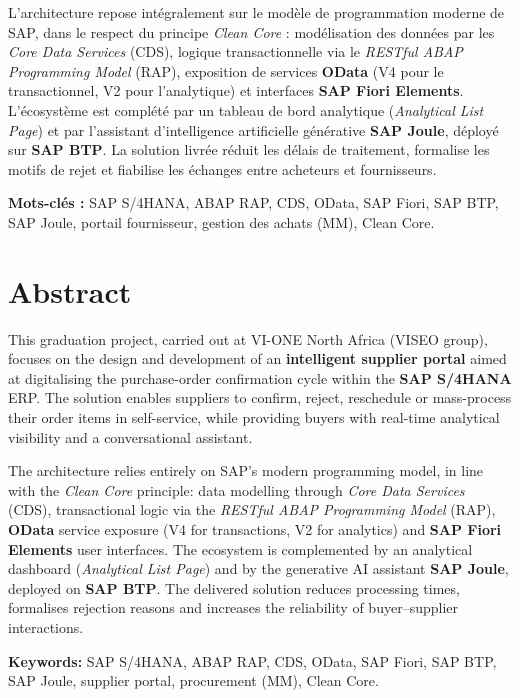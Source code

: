 \documentclass[12pt,a4paper,oneside]{report}
\begin{document}
L'architecture repose intégralement sur le modèle de programmation moderne de SAP, dans le
respect du principe \textit{Clean Core} : modélisation des données par les
\textit{Core Data Services} (CDS), logique transactionnelle via le \textit{RESTful ABAP
Programming Model} (RAP), exposition de services \textbf{OData} (V4 pour le
transactionnel, V2 pour l'analytique) et interfaces \textbf{SAP Fiori Elements}.
L'écosystème est complété par un tableau de bord analytique (\textit{Analytical List
Page}) et par l'assistant d'intelligence artificielle générative \textbf{SAP Joule},
déployé sur \textbf{SAP BTP}. La solution livrée réduit les délais de traitement,
formalise les motifs de rejet et fiabilise les échanges entre acheteurs et fournisseurs.

\vspace{0.3cm}
\noindent\textbf{Mots-clés :} SAP S/4HANA, ABAP RAP, CDS, OData, SAP Fiori, SAP BTP,
SAP Joule, portail fournisseur, gestion des achats (MM), Clean Core.

\chapter*{Abstract}
{}
\label{sec:abstract}

This graduation project, carried out at VI-ONE North Africa (VISEO group), focuses on the
design and development of an \textbf{intelligent supplier portal} aimed at digitalising the
purchase-order confirmation cycle within the \textbf{SAP S/4HANA} ERP. The solution enables
suppliers to confirm, reject, reschedule or mass-process their order items in self-service,
while providing buyers with real-time analytical visibility and a conversational assistant.

The architecture relies entirely on SAP's modern programming model, in line with the
\textit{Clean Core} principle: data modelling through \textit{Core Data Services} (CDS),
transactional logic via the \textit{RESTful ABAP Programming Model} (RAP), \textbf{OData}
service exposure (V4 for transactions, V2 for analytics) and \textbf{SAP Fiori Elements}
user interfaces. The ecosystem is complemented by an analytical dashboard
(\textit{Analytical List Page}) and by the generative AI assistant \textbf{SAP Joule},
deployed on \textbf{SAP BTP}. The delivered solution reduces processing times, formalises
rejection reasons and increases the reliability of buyer--supplier interactions.

\vspace{0.3cm}
\noindent\textbf{Keywords:} SAP S/4HANA, ABAP RAP, CDS, OData, SAP Fiori, SAP BTP,
SAP Joule, supplier portal, procurement (MM), Clean Core.
\end{document}
